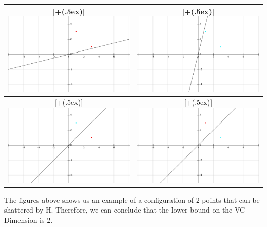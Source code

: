 \documentclass{article}
\newcommand*{\addheight}[2][.5ex]{%
  \raisebox{0pt}[\dimexpr\height+(#1)\relax]{#2}%
}
\begin{document}
\begin{table}[H]
\centering
\begin{tabular}{|c|c|}
	\hline
	\addheight{\includegraphics[width=70mm]{images/0.png}} &
	\addheight{\includegraphics[width=70mm]{images/3.png}} \\
	\hline
	\addheight{\includegraphics[width=70mm]{images/1.png}} &
	\addheight{\includegraphics[width=70mm]{images/2.png}} \\
	\hline
\end{tabular}
\end{table}

The figures above shows us an example of a configuration of 2 points that can be shattered by H. Therefore, we can conclude that the lower bound on the VC Dimension is 2.
\end{document}
